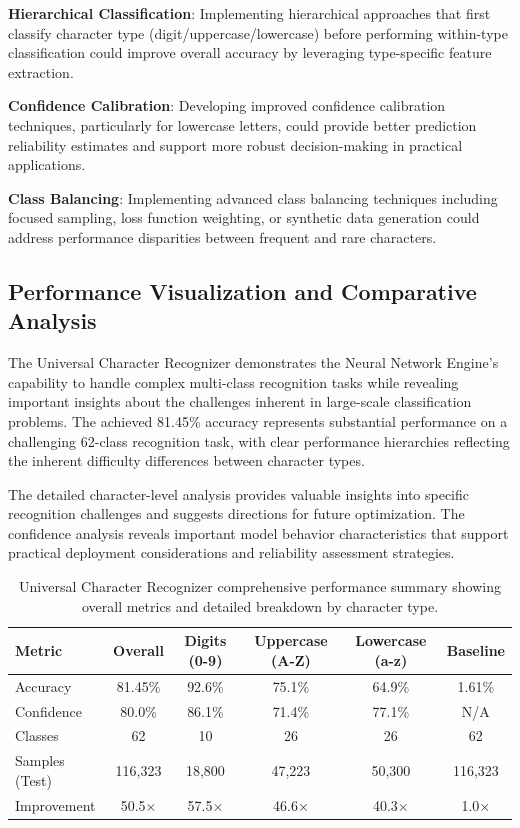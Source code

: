 \documentclass[11pt,a4paper]{report}
\begin{document}
\textbf{Hierarchical Classification}: Implementing hierarchical approaches that first classify character type (digit/uppercase/lowercase) before performing within-type classification could improve overall accuracy by leveraging type-specific feature extraction.

\textbf{Confidence Calibration}: Developing improved confidence calibration techniques, particularly for lowercase letters, could provide better prediction reliability estimates and support more robust decision-making in practical applications.

\textbf{Class Balancing}: Implementing advanced class balancing techniques including focused sampling, loss function weighting, or synthetic data generation could address performance disparities between frequent and rare characters.

\subsection{Performance Visualization and Comparative Analysis}

The Universal Character Recognizer demonstrates the Neural Network Engine's capability to handle complex multi-class recognition tasks while revealing important insights about the challenges inherent in large-scale classification problems. The achieved 81.45\% accuracy represents substantial performance on a challenging 62-class recognition task, with clear performance hierarchies reflecting the inherent difficulty differences between character types.

The detailed character-level analysis provides valuable insights into specific recognition challenges and suggests directions for future optimization. The confidence analysis reveals important model behavior characteristics that support practical deployment considerations and reliability assessment strategies.

\begin{table}[H]
\centering
\caption{Universal Character Recognizer comprehensive performance summary showing overall metrics and detailed breakdown by character type.}
\label{tab:universal_performance}
\begin{tabular}{lccccc}
\toprule
Metric & Overall & Digits (0-9) & Uppercase (A-Z) & Lowercase (a-z) & Baseline \\
\midrule
Accuracy & 81.45\% & 92.6\% & 75.1\% & 64.9\% & 1.61\% \\
Confidence & 80.0\% & 86.1\% & 71.4\% & 77.1\% & N/A \\
Classes & 62 & 10 & 26 & 26 & 62 \\
Samples (Test) & 116,323 & 18,800 & 47,223 & 50,300 & 116,323 \\
Improvement & 50.5× & 57.5× & 46.6× & 40.3× & 1.0× \\
\bottomrule
\end{tabular}
\end{table}
\end{document}

